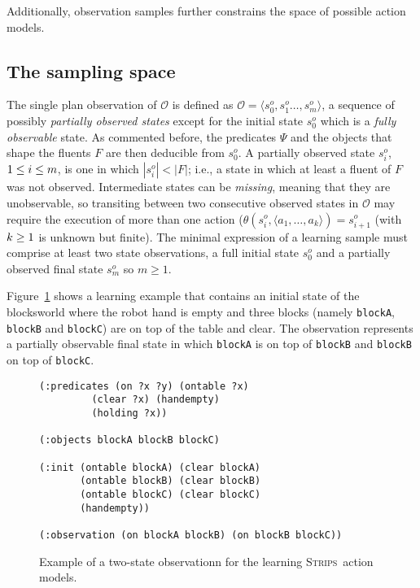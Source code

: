 \documentclass{article}
\newcommand{\tup}[1]{{\langle #1 \rangle}}
\newcommand{\strips}{\textsc{Strips}}
\begin{document}
Additionally, observation samples further constrains the space of possible action models.


\subsection{The sampling space}

The single plan observation of $\mathcal{O}$ is defined as $\mathcal{O}=\tup{s_0^o,s_1^o \ldots, s_m^o}$, a sequence of possibly {\em partially observed states} except for the initial state $s_0^o$ which is a {\em fully observable} state. As commented before, the predicates $\Psi$ and the objects that shape the fluents $F$ are then deducible from $s_0^o$. A partially observed state $s_i^o$, ${\small 1\leq i\leq m}$, is one in which $|s_i^o| < |F|$; i.e., a state in which at least a fluent of $F$ was not observed. Intermediate states can be {\em missing}, meaning that they are unobservable, so transiting between two consecutive observed states in $\mathcal{O}$ may require the execution of more than one action ($\theta(s_i^o,\tup{a_1,\ldots,a_k})=s_{i+1}^o$ (with ${\small k\geq 1}$ is unknown but finite). The minimal expression of a learning sample must comprise at least two state observations, a full initial state $s_0^o$ and a partially observed final state $s_m^o$ so $m \geq 1$.

Figure~\ref{fig:observation} shows a learning example that contains an initial state of the blocksworld where the robot hand is empty and three blocks (namely {\small\tt blockA}, {\small\tt blockB} and {\small\tt blockC}) are on top of the table and clear. The observation represents a partially observable final state in which {\tt\small{blockA}} is on top of {\tt\small{blockB}} and {\tt\small{blockB}} on top of {\tt\small{blockC}}.

\begin{figure}[hbt!]
  \begin{tiny}
  \begin{verbatim}
(:predicates (on ?x ?y) (ontable ?x)
	     (clear ?x) (handempty)
	     (holding ?x))

(:objects blockA blockB blockC)

(:init (ontable blockA) (clear blockA)
       (ontable blockB) (clear blockB)
       (ontable blockC) (clear blockC)
       (handempty))

(:observation (on blockA blockB) (on blockB blockC))
  \end{verbatim}
  \end{tiny}
	\caption{\small Example of a two-state observationn for the learning \strips\ action models.}
	\label{fig:observation}
\end{figure}
\end{document}
